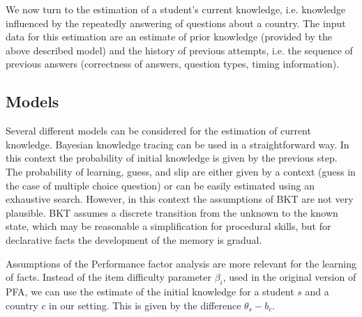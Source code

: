 \documentclass{edm_template}
\begin{document}
We now turn to the estimation of a student's current knowledge, i.e. knowledge
influenced by the repeatedly answering of questions about a country. The input
data for this estimation are an estimate of prior knowledge (provided by the
above described model) and the history of previous attempts, i.e. the sequence
of previous answers (correctness of answers, question types, timing
information).


\subsection{Models}

Several different models can be considered for the estimation of current
knowledge. Bayesian knowledge tracing can be used in a straightforward way. In
this context the probability of initial knowledge is given by the previous
step. The probability of learning, guess, and slip are either given by a context
(guess in the case of multiple choice question) or can be easily estimated
using an exhaustive search. However, in this context the assumptions of BKT are
not very plausible. BKT assumes a discrete transition from the unknown to the known
state, which may be reasonable a simplification for procedural skills, but for
declarative facts the development of the memory is gradual.

Assumptions of the Performance factor analysis are more relevant for the
learning of facts. Instead of the item difficulty parameter $\beta_i$, used in
the original version of PFA, we can use the estimate of the initial knowledge
for a student $s$ and a country $c$ in our setting. This is given by the
difference $\theta_s - b_c$.
\end{document}
